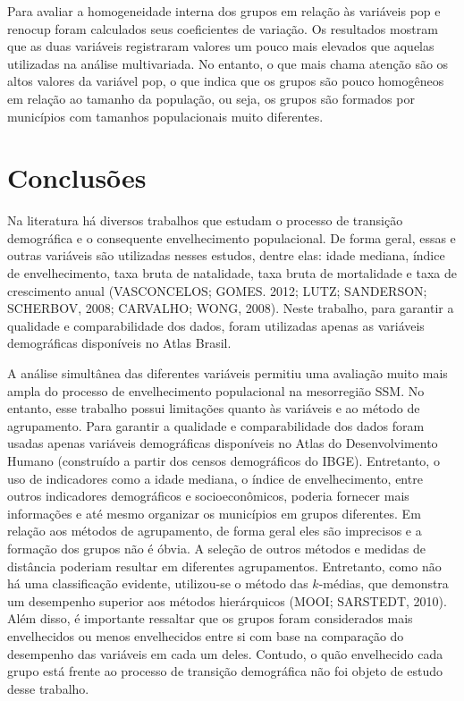 \documentclass[10pt,twoside]{article}
\begin{document}
Para avaliar a homogeneidade interna dos grupos em relação às variáveis pop e renocup foram calculados seus coeficientes de variação. Os resultados mostram que as duas variáveis registraram valores um pouco mais elevados que aquelas utilizadas na análise multivariada. No entanto, o que mais chama atenção são os altos valores da variável pop, o que indica que os grupos são pouco homogêneos em relação ao tamanho da população, ou seja, os grupos são formados por municípios com tamanhos populacionais muito diferentes.

	
	\section*{Conclusões}
	
Na literatura há diversos trabalhos que estudam o processo de transição demográfica e o consequente envelhecimento populacional. De forma geral, essas e outras variáveis são utilizadas nesses estudos, dentre elas: idade mediana, índice de envelhecimento, taxa bruta de natalidade, taxa bruta de mortalidade e taxa de crescimento anual (VASCONCELOS; GOMES. 2012; LUTZ; SANDERSON; SCHERBOV, 2008; CARVALHO; WONG, 2008). Neste trabalho, para garantir a qualidade e comparabilidade dos dados, foram utilizadas apenas as variáveis demográficas disponíveis no Atlas Brasil.
	
A análise simultânea das diferentes variáveis permitiu uma avaliação muito mais ampla do processo de envelhecimento populacional na mesorregião SSM. No entanto, esse trabalho possui limitações quanto às variáveis e ao método de agrupamento. Para garantir a qualidade e comparabilidade dos dados foram usadas apenas variáveis demográficas disponíveis no Atlas do Desenvolvimento Humano (construído a partir dos censos demográficos do IBGE). Entretanto, o uso de indicadores como a idade mediana, o índice de envelhecimento, entre outros indicadores demográficos e socioeconômicos, poderia fornecer mais informações e até mesmo organizar os municípios em grupos diferentes. Em relação aos métodos de agrupamento, de forma geral eles são imprecisos e a formação dos grupos não é óbvia. A seleção de outros métodos e medidas de distância poderiam resultar em diferentes agrupamentos. Entretanto, como não há uma classificação evidente, utilizou-se o método das $k$-médias, que demonstra um desempenho superior aos métodos
hierárquicos (MOOI; SARSTEDT, 2010). Além disso, é importante ressaltar que os grupos foram considerados mais envelhecidos ou menos envelhecidos entre si com base na comparação do desempenho das variáveis em cada um deles. Contudo, o quão envelhecido cada grupo está frente ao processo de transição demográfica não foi objeto de estudo desse trabalho.
\end{document}
